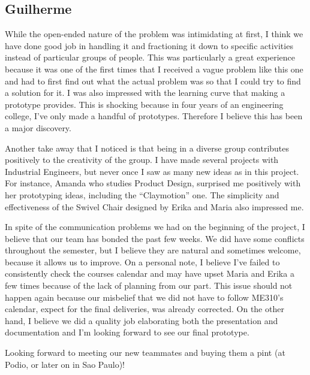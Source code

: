 \documentclass[a4paper, 12pt,conference]{new_cit_thesis}
\begin{document}
\subsection{Guilherme}
While the open-ended nature of the problem was intimidating at first, I think we have done good job in handling it and fractioning it down to specific activities instead of particular groups of people. This was particularly a great experience because it was one of the first times that I received a vague problem like this one and had to first find out what the actual problem was so that I could try to find a solution for it. I was also impressed with the learning curve that making a prototype provides. This is shocking because in four years of an engineering college, I’ve only made a handful of prototypes. Therefore I believe this has been a major discovery.

Another take away that I noticed is that being in a diverse group contributes positively to the creativity of the group.  I have made several projects with Industrial Engineers, but never once I saw as many new ideas as in this project. For instance, Amanda who studies Product Design, surprised me positively with her prototyping ideas, including the “Claymotion” one. The simplicity and effectiveness of the Swivel Chair designed by Erika and Maria also impressed me.

In spite of the communication problems we had on the beginning of the project, I believe that our team has bonded the past few weeks. We did have some conflicts throughout the semester, but I believe they are natural and sometimes welcome, because it allows us to improve. On a personal note, I believe I’ve failed to consistently check the courses calendar and may have upset Maria and Erika a few times because of the lack of planning from our part. This issue should not happen again because our misbelief that we did not have to follow ME310’s calendar, expect for the final deliveries, was already corrected. On the other hand, I believe we did a quality job elaborating both the presentation and documentation and I’m looking forward to see our final prototype.

Looking forward to meeting our new teammates and buying them a pint (at Podio, or later on in Sao Paulo)!
\end{document}
